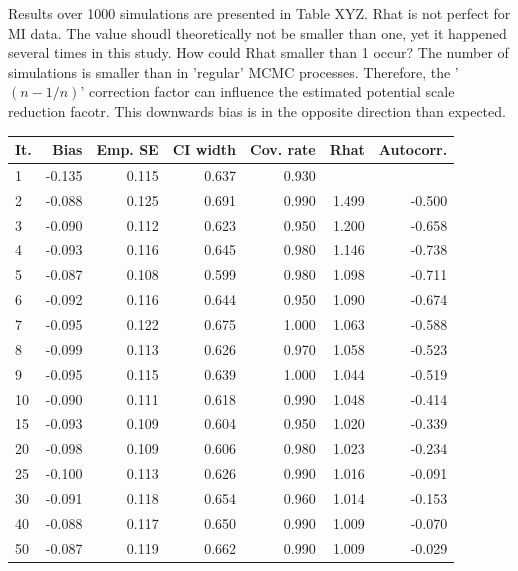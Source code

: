 \documentclass[article]{jss}
\begin{document}
Results over 1000 simulations are presented in Table XYZ. Rhat is not perfect for MI data. The value shoudl theoretically not be smaller than one, yet it happened several times in this study. How could Rhat smaller than 1 occur? The number of simulations is smaller than in 'regular' MCMC processes. Therefore, the '$(n-1/n)$' correction factor can influence the estimated potential scale reduction facotr. This downwards bias is in the opposite direction than expected. 

\begin{table}[ht]
\centering
\begin{tabular}{lrrrrrr}
  \hline
It. & Bias & Emp. SE & CI width & Cov. rate & Rhat & Autocorr. \\ 
  \hline
  1 & -0.135 & 0.115 & 0.637 & 0.930 &  &   \\ 
  2 & -0.088 & 0.125 & 0.691 & 0.990 & 1.499 & -0.500 \\ 
  3 & -0.090 & 0.112 & 0.623 & 0.950 & 1.200 & -0.658 \\ 
  4 & -0.093 & 0.116 & 0.645 & 0.980 & 1.146 & -0.738 \\ 
  5 & -0.087 & 0.108 & 0.599 & 0.980 & 1.098 & -0.711 \\ 
  6 & -0.092 & 0.116 & 0.644 & 0.950 & 1.090 & -0.674 \\ 
  7 & -0.095 & 0.122 & 0.675 & 1.000 & 1.063 & -0.588 \\ 
  8 & -0.099 & 0.113 & 0.626 & 0.970 & 1.058 & -0.523 \\ 
  9 & -0.095 & 0.115 & 0.639 & 1.000 & 1.044 & -0.519 \\ 
  10 & -0.090 & 0.111 & 0.618 & 0.990 & 1.048 & -0.414 \\ 
  15 & -0.093 & 0.109 & 0.604 & 0.950 & 1.020 & -0.339 \\ 
  20 & -0.098 & 0.109 & 0.606 & 0.980 & 1.023 & -0.234 \\ 
  25 & -0.100 & 0.113 & 0.626 & 0.990 & 1.016 & -0.091 \\ 
  30 & -0.091 & 0.118 & 0.654 & 0.960 & 1.014 & -0.153 \\ 
  40 & -0.088 & 0.117 & 0.650 & 0.990 & 1.009 & -0.070 \\ 
  50 & -0.087 & 0.119 & 0.662 & 0.990 & 1.009 & -0.029 \\ 

\end{tabular}
\end{table}
\end{document}
